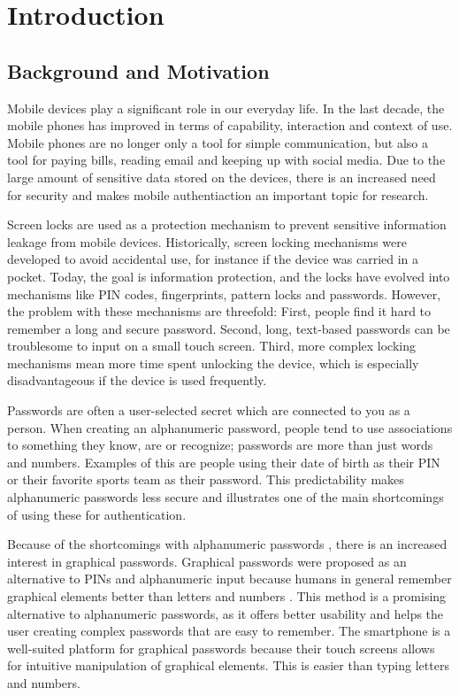 \chapter{Introduction}\label{chap:introduction}
	
	\clearpage
	\section{Background and Motivation} \label{sec:backgroundandmotivation}
		Mobile devices play a significant role in our everyday life. In the last decade, the mobile phones has improved in terms of capability, interaction and context of use. Mobile phones are no longer only a tool for simple communication, but also a tool for paying bills, reading email and keeping up with social media. Due to the large amount of sensitive data stored on the devices, there is an increased need for security and makes mobile authentiaction an important topic for research.
    
		Screen locks are used as a protection mechanism to prevent sensitive information leakage from mobile devices. Historically, screen locking mechanisms were developed to avoid accidental use, for instance if the device was carried in a pocket. Today, the goal is information protection, and the locks have evolved into mechanisms like PIN codes, fingerprints, pattern locks and passwords. However, the problem with these mechanisms are threefold: First, people find it hard to remember a long and secure password. Second, long, text-based passwords can be troublesome to input on a small touch screen. Third, more complex locking mechanisms mean more time spent unlocking the device, which is especially disadvantageous if the device is used frequently.

    
		Passwords are often a user-selected secret which are connected to you as a person. When creating an alphanumeric password, people tend to use associations to something they know, are or recognize; passwords are more than just words and numbers. Examples of this are people using their date of birth as their PIN or their favorite sports team as their password. This predictability makes alphanumeric passwords less secure and illustrates one of the main shortcomings of using these for authentication.

		Because of the shortcomings with alphanumeric passwords \cite{UnixPasswords}, there is an increased interest in graphical passwords. Graphical passwords were proposed as an alternative to PINs and alphanumeric input because humans in general remember graphical elements better than letters and numbers \cite{DeAngeli}. This method is a promising alternative to alphanumeric passwords, as it offers better usability and helps the user creating complex passwords that are easy to remember. The smartphone is a well-suited platform for graphical passwords because their touch screens allows for intuitive manipulation of graphical elements. This is easier than typing letters and numbers. 
    
